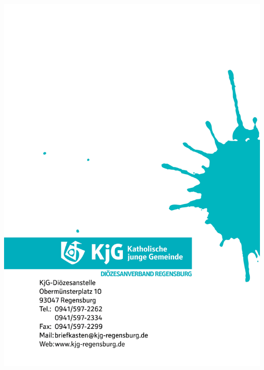 \documentclass[12pt]{report}
\begin{document}
\begin{flushleft}
\newpage
\pagestyle{empty}
\includegraphics[width=\paperwidth, height=\paperheight]{kjgsatzungende.png}
\restoregeometry
\end{flushleft}
\end{document}
